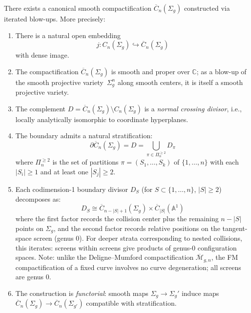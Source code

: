 \begin{theorem}\label{thm:FM}
There exists a canonical smooth compactification $\overline{C}_n(\Sigma_g)$ constructed via iterated blow-ups. More precisely:

\begin{enumerate}
\item There is a natural open embedding
\[j: C_n(\Sigma_g) \hookrightarrow \overline{C}_n(\Sigma_g)\]
with dense image.

\item The compactification $\overline{C}_n(\Sigma_g)$ is smooth and proper over $\mathbb{C}$; as a blow-up of the smooth projective variety~$\Sigma_g^n$ along smooth centers, it is itself a smooth projective variety.

\item The complement $D = \overline{C}_n(\Sigma_g) \setminus C_n(\Sigma_g)$ is a \emph{normal crossing divisor}, i.e., locally analytically isomorphic to coordinate hyperplanes.

\item The boundary admits a natural stratification:
\[\partial\overline{C}_n(\Sigma_g) = D = \bigcup_{\pi \in \Pi_n^{\geq 2}} D_\pi\]
where $\Pi_n^{\geq 2}$ is the set of partitions $\pi = (S_1, \ldots, S_k)$ of $\{1,\ldots,n\}$ with each $|S_i| \geq 1$ and at least one $|S_j| \geq 2$.

\item Each codimension-1 boundary divisor $D_S$ (for $S \subset \{1,\ldots,n\}$, $|S| \geq 2$) decomposes as:
\[D_S \cong \overline{C}_{n-|S|+1}(\Sigma_g) \times \overline{C}_{|S|}(\mathbb{A}^1)\]
where the first factor records the collision center plus the remaining $n-|S|$ points on $\Sigma_g$, and the second factor records relative positions on the tangent-space screen (genus 0). For deeper strata corresponding to nested collisions, this iterates: screens within screens give products of genus-0 configuration spaces. Note: unlike the Deligne--Mumford compactification $\overline{\mathcal{M}}_{g,n}$, the FM compactification of a fixed curve involves no curve degeneration; all screens are genus 0.

\item The construction is \emph{functorial}: smooth maps $\Sigma_g \to \Sigma_g'$ induce maps $\overline{C}_n(\Sigma_g) \to \overline{C}_n(\Sigma_{g'})$ compatible with stratification.
\end{enumerate}
\end{theorem}

